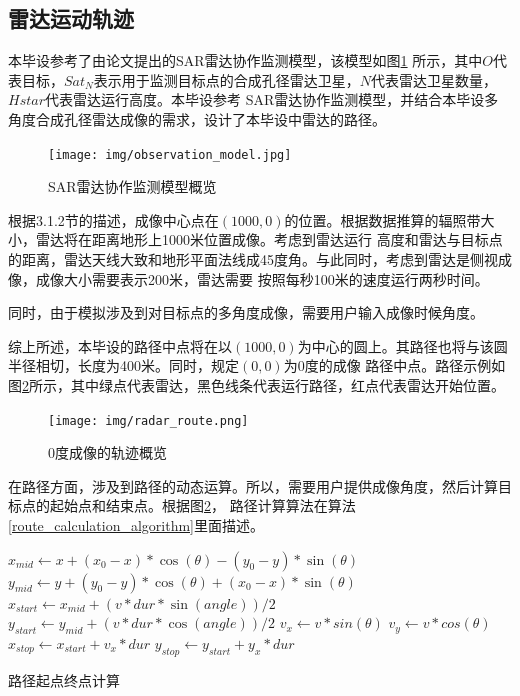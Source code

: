 \documentclass{xduugthesis}
\begin{document}
\subsection{雷达运动轨迹}
本毕设参考了由论文\parencite{SAR_Observation_Model}提出的SAR雷达协作监测模型，该模型如图\ref{observation_model_image}
所示，其中$O$代表目标，$Sat_{N}$表示用于监测目标点的合成孔径雷达卫星，$N$代表雷达卫星数量，$Hstar$代表雷达运行高度。本毕设参考
SAR雷达协作监测模型，并结合本毕设多角度合成孔径雷达成像的需求，设计了本毕设中雷达的路径。\par
\begin{figure}[ht!]
	\centering
	\texttt{[image: img/observation\_model.jpg]}
	\caption{SAR雷达协作监测模型概览}\label{observation_model_image}
\end{figure}\par
根据3.1.2节的描述，成像中心点在$(1000,0)$的位置。根据数据推算的辐照带大小，雷达将在距离地形上1000米位置成像。考虑到雷达运行
高度和雷达与目标点的距离，雷达天线大致和地形平面法线成45度角。与此同时，考虑到雷达是侧视成像，成像大小需要表示200米，雷达需要
按照每秒100米的速度运行两秒时间。\par
同时，由于模拟涉及到对目标点的多角度成像，需要用户输入成像时候角度。\par
综上所述，本毕设的路径中点将在以$(1000,0)$为中心的圆上。其路径也将与该圆半径相切，长度为400米。同时，规定$(0,0)$为0度的成像
路径中点。路径示例如图\ref{radar_route_image}所示，其中绿点代表雷达，黑色线条代表运行路径，红点代表雷达开始位置。
\begin{figure}[ht!]
	\centering
	\texttt{[image: img/radar\_route.png]}
	\caption{0度成像的轨迹概览}\label{radar_route_image}
\end{figure}\par
在路径方面，涉及到路径的动态运算。所以，需要用户提供成像角度，然后计算目标点的起始点和结束点。根据图\ref{radar_route_image}，
路径计算算法在算法\ref{route_calculation_algorithm}里面描述。\par
\IncMargin{2em}
\begin{algorithm}[H]
	$x_{mid} \leftarrow x + (x_0 - x) * \cos(\theta) - (y_0 - y) * \sin(\theta)$\;
	$y_{mid} \leftarrow y + (y_0 - y) * \cos(\theta) + (x_0 - x) * \sin(\theta)$\;
	$x_{start} \leftarrow x_{mid} + (v * dur * \sin(angle))/2 $\;
	$y_{start} \leftarrow y_{mid} + (v * dur * \cos(angle))/2 $\;
	$v_x \leftarrow v * sin(\theta)$\;
	$v_y \leftarrow v * cos(\theta)$\;
	$x_{stop} \leftarrow x_{start} + v_x * dur $\;
	$y_{stop} \leftarrow y_{start} + y_x * dur $\;
	\caption{路径起点终点计算}\label{route_calculation_algorithm}
\end{algorithm}
\DecMargin{2em}
\end{document}
